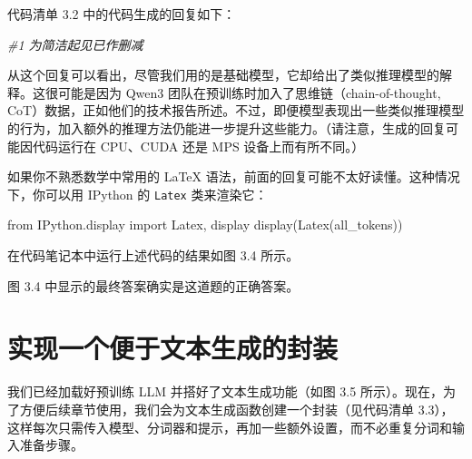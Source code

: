 代码清单 3.2 中的代码生成的回复如下：

{\noindent\small\textit{\#1 为简洁起见已作删减}\par}

从这个回复可以看出，尽管我们用的是基础模型，它却给出了类似推理模型的解释。这很可能是因为 Qwen3 团队在预训练时加入了思维链（chain-of-thought, CoT）数据，正如他们的技术报告所述。不过，即便模型表现出一些类似推理模型的行为，加入额外的推理方法仍能进一步提升这些能力。（请注意，生成的回复可能因代码运行在 CPU、CUDA 还是 MPS 设备上而有所不同。）

如果你不熟悉数学中常用的 LaTeX 语法，前面的回复可能不太好读懂。这种情况下，你可以用 IPython 的 \texttt{Latex} 类来渲染它：

\begin{codebox}
from IPython.display import Latex, display
display(Latex(all_tokens))
\end{codebox}

在代码笔记本中运行上述代码的结果如图 3.4 所示。


图 3.4 中显示的最终答案确实是这道题的正确答案。

\section{实现一个便于文本生成的封装}

我们已经加载好预训练 LLM 并搭好了文本生成功能（如图 3.5 所示）。现在，为了方便后续章节使用，我们会为文本生成函数创建一个封装（见代码清单 3.3），这样每次只需传入模型、分词器和提示，再加一些额外设置，而不必重复分词和输入准备步骤。


